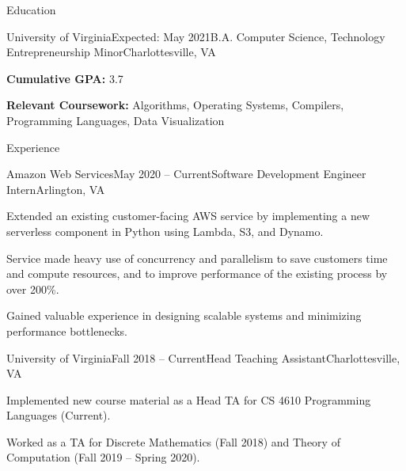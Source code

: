 \documentclass{resume}
\begin{document}
\vspace{-1em}
\begin{rSection}{Education}

  \begin{rSubsection}{University of Virginia}{Expected: May 2021}{B.A. Computer Science, Technology Entrepreneurship Minor}{Charlottesville, VA}
    \item \textbf{Cumulative GPA:} 3.7
    \item \textbf{Relevant Coursework:} Algorithms, Operating Systems, Compilers, Programming Languages, Data Visualization
  \end{rSubsection}

\end{rSection}

\begin{rSection}{Experience}
  \begin{rSubsection}{Amazon Web Services}{May 2020 -- Current}{Software Development Engineer Intern}{Arlington, VA}
    \item Extended an existing customer-facing AWS service by implementing a new serverless component in Python using Lambda, S3, and Dynamo.
    \item Service made heavy use of concurrency and parallelism to save customers time and compute resources, and to improve performance of the existing process by over 200\%.
    \item Gained valuable experience in designing scalable systems and minimizing performance bottlenecks.
  \end{rSubsection}

  \begin{rSubsection}{University of Virginia}{Fall 2018 -- Current}{Head Teaching Assistant}{Charlottesville, VA}
    \item Implemented new course material as a Head TA for CS 4610 Programming Languages (Current).
    \item Worked as a TA for Discrete Mathematics (Fall 2018) and Theory of Computation (Fall 2019 -- Spring 2020).
  \end{rSubsection}


\end{rSection}
\end{document}

